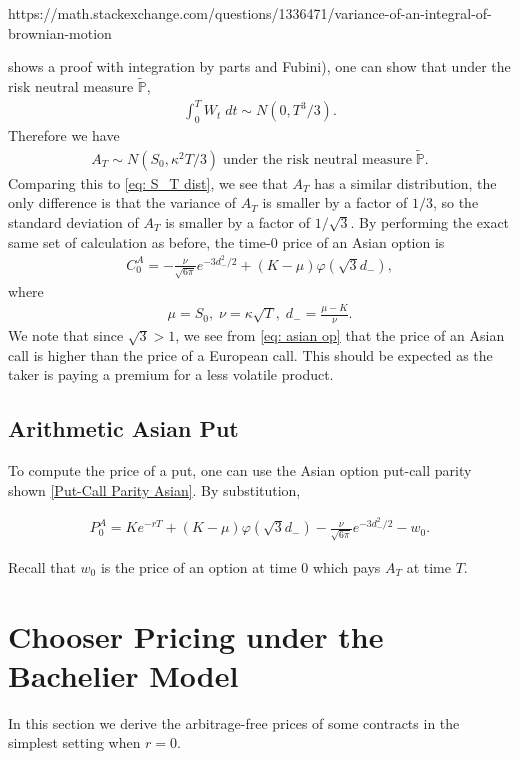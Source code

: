 \documentclass[reqno]{amsart}
\begin{document}
https://math.stackexchange.com/questions/1336471/variance-of-an-integral-of-brownian-motion 

shows a proof with integration by parts and Fubini), one can show that under the risk neutral measure $\tilde{\mathbb{P}}$, 
\begin{align}
	 \int_0^T W_t \; dt \sim N(0, T^3/3).
\end{align}
Therefore we have 
\begin{align}
	 A_T \sim N(S_0, \kappa^2 T/3) \; \text{under the risk neutral measure} \; \tilde{\mathbb{P}}.
\end{align}
Comparing this to \eqref{eq: S_T dist}, we see that $A_T$ has a similar distribution, the only difference is that the variance of $A_T$ is smaller by a factor of $1/3$, so the standard deviation of $A_T$ is smaller by a factor of $1/\sqrt{3}$. By performing the exact same set of calculation as before, the time-0 price of an Asian option is 
\begin{align} \label{eq: asian op}
	 C^A_0 = -\frac{\nu}{\sqrt{6\pi}} e^{-3d_-^2/2} + (K-\mu) \varphi(\sqrt{3}d_-),
\end{align}
where 
\begin{align}
	 \mu = S_0, \; \nu = \kappa \sqrt{T}, \; d_- = \frac{\mu - K}{\nu}.
\end{align}
We note that since $\sqrt{3} > 1$, we see from \eqref{eq: asian op} that the price of an Asian call is higher than the price of a European call. This should be expected as the taker is paying a premium for a less volatile product. 


\subsection{Arithmetic Asian Put}
To compute the price of a put, one can use the Asian option put-call parity shown \eqref{Put-Call Parity Asian}. By substitution, 

\begin{align}
     P^A_0 = Ke^{-rT} + (K-\mu) \varphi(\sqrt{3}d_-) - \frac{\nu}{\sqrt{6\pi}} e^{-3d_-^2/2} - w_0.
\end{align}

Recall that $w_0$ is the price of an option at time 0 which pays $A_T$ at time $T$.

\section{Chooser Pricing under the Bachelier Model}
In this section we derive the arbitrage-free prices of some contracts in the simplest setting when $r = 0$.  
\end{document}
